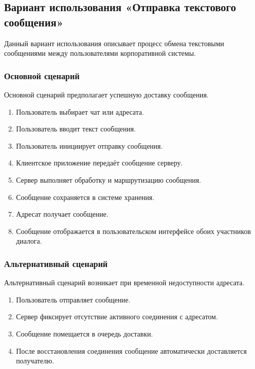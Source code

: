 \subsection{Вариант использования «Отправка текстового сообщения»}

Данный вариант использования описывает процесс обмена текстовыми сообщениями между пользователями корпоративной системы.

\subsubsection{Основной сценарий}

Основной сценарий предполагает успешную доставку сообщения.

\begin{enumerate}
    \item Пользователь выбирает чат или адресата.
    \item Пользователь вводит текст сообщения.
    \item Пользователь инициирует отправку сообщения.
    \item Клиентское приложение передаёт сообщение серверу.
    \item Сервер выполняет обработку и маршрутизацию сообщения.
    \item Сообщение сохраняется в системе хранения.
    \item Адресат получает сообщение.
    \item Сообщение отображается в пользовательском интерфейсе обоих участников диалога.
\end{enumerate}

\subsubsection{Альтернативный сценарий}

Альтернативный сценарий возникает при временной недоступности адресата.

\begin{enumerate}
    \item Пользователь отправляет сообщение.
    \item Сервер фиксирует отсутствие активного соединения с адресатом.
    \item Сообщение помещается в очередь доставки.
    \item После восстановления соединения сообщение автоматически доставляется получателю.
\end{enumerate}

